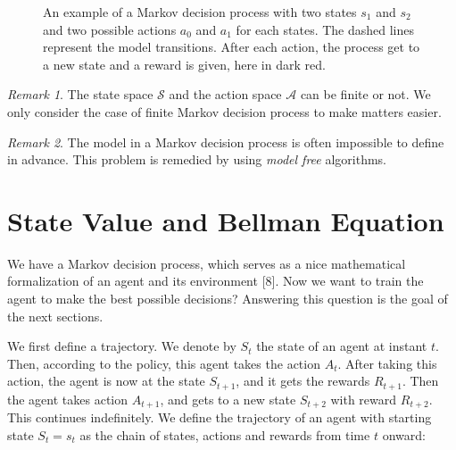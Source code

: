 \documentclass[
  letterpaper,
]{report}
\theoremstyle{definition}
\theoremstyle{plain}
\theoremstyle{definition}
\theoremstyle{remark}
\newtheorem*{remark}{Remark}
\begin{document}
\begin{figure}


\caption{\label{fig-MDP\_example}An example of a Markov decision process
with two states \(s_1\) and \(s_2\) and two possible actions \(a_0\) and
\(a_1\) for each states. The dashed lines represent the model
transitions. After each action, the process get to a new state and a
reward is given, here in dark red.}

\end{figure}%

\begin{remark}
The state space \(\mathcal{S}\) and the action space \(\mathcal{A}\) can
be finite or not. We only consider the case of finite Markov decision
process to make matters easier.
\end{remark}

\begin{remark}
The model in a Markov decision process is often impossible to define in
advance. This problem is remedied by using \emph{model free} algorithms.
\end{remark}

\section{State Value and Bellman
Equation}\label{state-value-and-bellman-equation}

We have a Markov decision process, which serves as a nice mathematical
formalization of an agent and its environment {[}8{]}. Now we want to
train the agent to make the best possible decisions? Answering this
question is the goal of the next sections.

We first define a trajectory. We denote by \(S_t\) the state of an agent
at instant \(t\). Then, according to the policy, this agent takes the
action \(A_t\). After taking this action, the agent is now at the state
\(S_{t+1}\), and it gets the rewards \(R_{t+1}\). Then the agent takes
action \(A_{t+1}\), and gets to a new state \(S_{t+2}\) with reward
\(R_{t+2}\). This continues indefinitely. We define the trajectory of an
agent with starting state \(S_t = s_t\) as the chain of states, actions
and rewards from time \(t\) onward:
\end{document}
